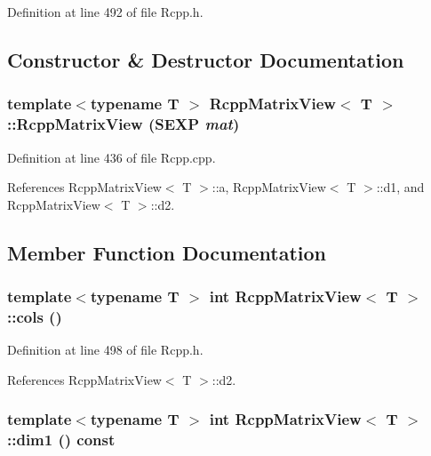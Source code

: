 Definition at line 492 of file Rcpp.h.

\subsection{Constructor \& Destructor Documentation}
\hypertarget{classRcppMatrixView_ac3489c6a24c2975f3ea7103ada50e328}{
\subsubsection[{RcppMatrixView}]{\setlength{\rightskip}{0pt plus 5cm}template$<$typename T $>$ {\bf RcppMatrixView}$<$ T $>$::{\bf RcppMatrixView} (SEXP {\em mat})}}
\label{classRcppMatrixView_ac3489c6a24c2975f3ea7103ada50e328}


Definition at line 436 of file Rcpp.cpp.

References RcppMatrixView$<$ T $>$::a, RcppMatrixView$<$ T $>$::d1, and RcppMatrixView$<$ T $>$::d2.

\subsection{Member Function Documentation}
\hypertarget{classRcppMatrixView_a037e6fee7e029eef53c35a63f11e2e2a}{
\subsubsection[{cols}]{\setlength{\rightskip}{0pt plus 5cm}template$<$typename T $>$ int {\bf RcppMatrixView}$<$ T $>$::cols ()}}
\label{classRcppMatrixView_a037e6fee7e029eef53c35a63f11e2e2a}


Definition at line 498 of file Rcpp.h.

References RcppMatrixView$<$ T $>$::d2.\hypertarget{classRcppMatrixView_a72d1d7fcdc4b1cc6dd877b1df2f9f5e6}{
\subsubsection[{dim1}]{\setlength{\rightskip}{0pt plus 5cm}template$<$typename T $>$ int {\bf RcppMatrixView}$<$ T $>$::dim1 () const}}
\label{classRcppMatrixView_a72d1d7fcdc4b1cc6dd877b1df2f9f5e6}


